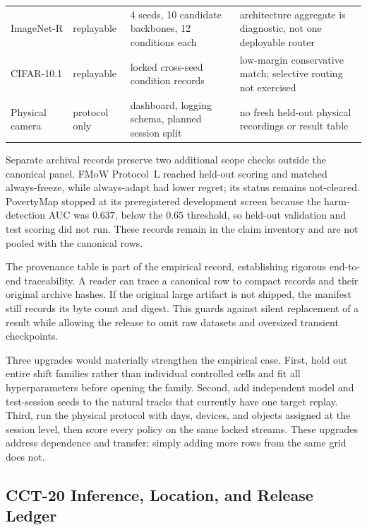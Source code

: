 \begin{table}[!t]
\begin{tabular}{@{}p{}p{}p{}p{}@{}}
ImageNet-R & replayable & 4 seeds, 10 candidate backbones, 12 conditions each & architecture aggregate is diagnostic, not one deployable router \\
CIFAR-10.1 & replayable & locked cross-seed condition records & low-margin conservative match; selective routing not exercised \\
Physical camera & protocol only & dashboard, logging schema, planned session split & no fresh held-out physical recordings or result table \\
\bottomrule
\end{tabular}
\end{table}

Separate archival records preserve two additional scope checks outside the canonical panel. FMoW
Protocol~L reached held-out scoring and matched always-freeze, while always-adapt had lower regret;
its status remains not-cleared. PovertyMap stopped at its preregistered development screen because
the harm-detection AUC was $0.637$, below the $0.65$ threshold, so held-out validation and test
scoring did not run. These records remain in the claim inventory and are not pooled with the
canonical rows.

The provenance table is part of the empirical record, establishing rigorous end-to-end traceability. A reader can trace a
canonical row to compact records and their original archive hashes. If the original large artifact
is not shipped, the manifest still records its byte count and digest. This guards against silent
replacement of a result while allowing the release to omit raw datasets and oversized transient
checkpoints.

Three upgrades would materially strengthen the empirical case. First, hold out entire shift
families rather than individual controlled cells and fit all hyperparameters before opening the
family. Second, add independent model and test-session seeds to the natural tracks that currently
have one target replay. Third, run the physical protocol with days, devices, and objects assigned at
the session level, then score every policy on the same locked streams. These upgrades address
dependence and transfer; simply adding more rows from the same grid does not.

\subsection{CCT-20 Inference, Location, and Release Ledger}
\label{app:cct20-ledger}

